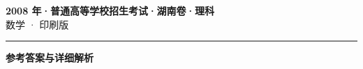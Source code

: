 \documentclass[zihao=5, a4paper]{ctexart}
\begin{document}
\begin{center}
  {\Large\bfseries 2008 年·普通高等学校招生考试·湖南卷·理科}\\[4pt]
  {\large 数学 · 印刷版}
\end{center}
\medskip
{}

\par\bigskip\hrule\bigskip
{}
\begin{center}{\large\bfseries 参考答案与详细解析}\end{center}
\smallskip

\end{document}
